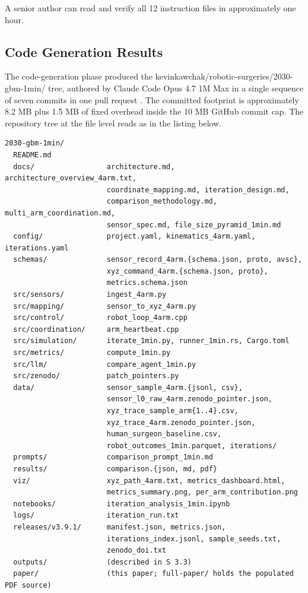 A senior author can read and verify all 12 instruction files in
approximately one hour.

\subsection{Code Generation Results}
\label{sec:results-code-generation}

The code-generation phase produced the
kevinkawchak/robotic-surgeries/2030-gbm-1min/ tree, authored by
Claude Code Opus 4.7 1M Max \cite{claude-opus-47, claude-code} in a
single sequence of seven commits in one pull request
\cite{repo-robotic-surgeries}. The committed footprint is
approximately 8.2 MB plus 1.5 MB of fixed overhead inside the 10 MB
GitHub commit cap. The repository tree at the file level reads as
in the listing below.

\begin{verbatim}
2030-gbm-1min/
  README.md
  docs/                 architecture.md, architecture_overview_4arm.txt,
                        coordinate_mapping.md, iteration_design.md,
                        comparison_methodology.md, multi_arm_coordination.md,
                        sensor_spec.md, file_size_pyramid_1min.md
  config/               project.yaml, kinematics_4arm.yaml, iterations.yaml
  schemas/              sensor_record_4arm.{schema.json, proto, avsc},
                        xyz_command_4arm.{schema.json, proto},
                        metrics.schema.json
  src/sensors/          ingest_4arm.py
  src/mapping/          sensor_to_xyz_4arm.py
  src/control/          robot_loop_4arm.cpp
  src/coordination/     arm_heartbeat.cpp
  src/simulation/       iterate_1min.py, runner_1min.rs, Cargo.toml
  src/metrics/          compute_1min.py
  src/llm/              compare_agent_1min.py
  src/zenodo/           patch_pointers.py
  data/                 sensor_sample_4arm.{jsonl, csv},
                        sensor_l0_raw_4arm.zenodo_pointer.json,
                        xyz_trace_sample_arm{1..4}.csv,
                        xyz_trace_4arm.zenodo_pointer.json,
                        human_surgeon_baseline.csv,
                        robot_outcomes_1min.parquet, iterations/
  prompts/              comparison_prompt_1min.md
  results/              comparison.{json, md, pdf}
  viz/                  xyz_path_4arm.txt, metrics_dashboard.html,
                        metrics_summary.png, per_arm_contribution.png
  notebooks/            iteration_analysis_1min.ipynb
  logs/                 iteration_run.txt
  releases/v3.9.1/      manifest.json, metrics.json,
                        iterations_index.jsonl, sample_seeds.txt,
                        zenodo_doi.txt
  outputs/              (described in S 3.3)
  paper/                (this paper; full-paper/ holds the populated PDF source)
\end{verbatim}

